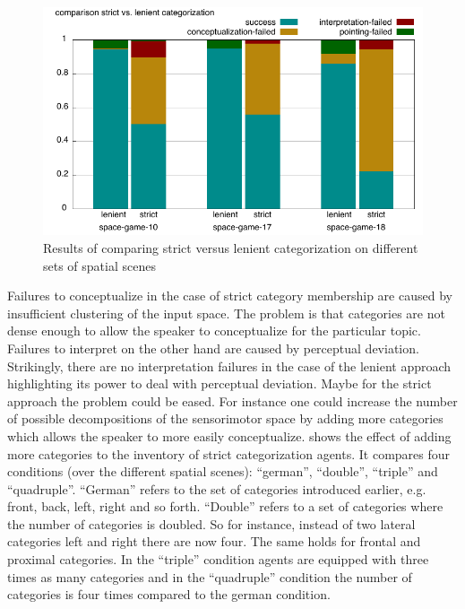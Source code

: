 \begin{figure}
\begin{center}
\includegraphics[width=.8\columnwidth]{figs/apply-filter-comparison}
\end{center}
\caption[Comparison of filter type semantics and apply semantics]
{Results of comparing strict versus lenient categorization
on different sets of spatial scenes}
\label{f:apply-filter-comparison}
\end{figure}

Failures to conceptualize in the case of strict category membership are caused by 
insufficient clustering of the input space. The problem is that categories are not
dense enough to allow the speaker to conceptualize for the particular topic.
Failures to interpret on the other hand are caused by perceptual deviation.
Strikingly, there are no interpretation failures in the case of the lenient approach
highlighting its power to deal with perceptual deviation. Maybe for the strict
approach the problem could be eased. For instance one could increase
the number of possible decompositions of the sensorimotor space
by adding more categories which allows the speaker to more easily conceptualize.
 shows the effect of 
adding more categories to the inventory of strict categorization agents.
It compares four conditions (over the different spatial scenes):
``german'', ``double'', ``triple'' and ``quadruple''.
``German'' refers to the set of categories introduced earlier, e.g. front, back, left, 
right and so forth. ``Double'' refers to a set of categories where the number of 
categories is doubled. So for instance, instead of two lateral categories left and right 
there are now four. The same holds for frontal and proximal categories. In the ``triple'' 
condition agents are equipped with three times as many categories and in the
``quadruple'' condition the number of categories is four times compared to the 
german condition. 

